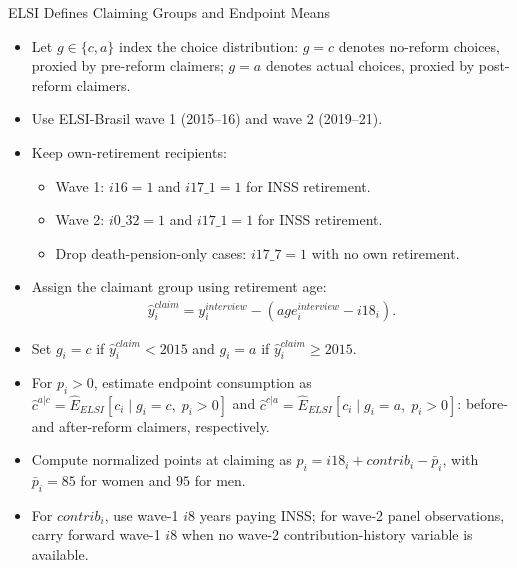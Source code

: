 \begin{frame}[label=elsiGroups]{ELSI Defines Claiming Groups and Endpoint Means}
    \scriptsize
    \begin{itemize}
        \item Let $g\in\{c,a\}$ index the choice distribution: $g=c$ denotes no-reform choices, proxied by pre-reform claimers; $g=a$ denotes actual choices, proxied by post-reform claimers.
        \item Use ELSI-Brasil wave 1 (2015--16) and wave 2 (2019--21).
        \item Keep own-retirement recipients:
        \begin{itemize}
            \item Wave 1: $i16=1$ and $i17\_1=1$ for INSS retirement.
            \item Wave 2: $i0\_32=1$ and $i17\_1=1$ for INSS retirement.
            \item Drop death-pension-only cases: $i17\_7=1$ with no own retirement.
        \end{itemize}
        \item Assign the claimant group using retirement age:
        \begin{align*}
            \widehat y_i^{claim}
            =
            y_i^{interview}
            -
            \left(age_i^{interview}-i18_i\right).
        \end{align*}
        \item Set $g_i=c$ if $\widehat y_i^{claim}<2015$ and $g_i=a$ if $\widehat y_i^{claim}\geq 2015$.
        \item For $p_i>0$, estimate endpoint consumption as $\widehat c^{a|c}=\widehat E_{ELSI}\!\left[c_i\mid g_i=c,\;p_i>0\right]$ and $\widehat c^{c|a}=\widehat E_{ELSI}\!\left[c_i\mid g_i=a,\;p_i>0\right]$: before- and after-reform claimers, respectively.
        \item Compute normalized points at claiming as $p_i=i18_i+contrib_i-\bar p_i$, with $\bar p_i=85$ for women and $95$ for men.
        \item For $contrib_i$, use wave-1 $i8$ years paying INSS; for wave-2 panel observations, carry forward wave-1 $i8$ when no wave-2 contribution-history variable is available.
    \end{itemize}
\end{frame}

